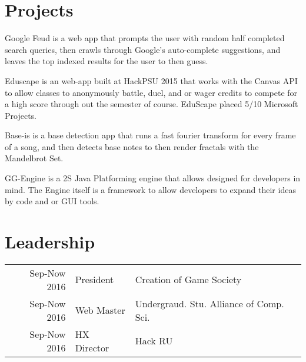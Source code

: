 \documentclass[]{deedy-resume-openfont}
\begin{document}
\begin{minipage}[t]{0.66\textwidth}
\section{Projects}
Google Feud is a web app that prompts the user with random half completed search queries, then crawls through Google's auto-complete suggestions, and leaves the top indexed results for the user to then guess. 
\sectionsep

Eduscape is an web-app built at HackPSU 2015 that works with the Canvas API to allow classes to anonymously battle, duel, and or wager credits to compete for a high score through out the semester of course. EduScape placed 5/10 Microsoft Projects.  
\sectionsep

Base-is is a base detection app that runs a fast fourier transform for every frame of a song, and then detects base notes to then render fractals with the Mandelbrot Set. 
\sectionsep

GG-Engine is a 2S Java Platforming engine that allows designed for developers in mind. The Engine itself is a framework to allow developers to expand their ideas by code and or GUI tools.
\sectionsep


\section{Leadership} 
\begin{tabular}{rll}
Sep-Now 2016 & President  & Creation of Game Society\\
Sep-Now 2016 & Web Master & Undergraud. Stu. Alliance of Comp. Sci. \\
Sep-Now 2016 & HX Director  & Hack RU \\ 

\end{tabular}
\sectionsep

\end{minipage} 
\end{document}
